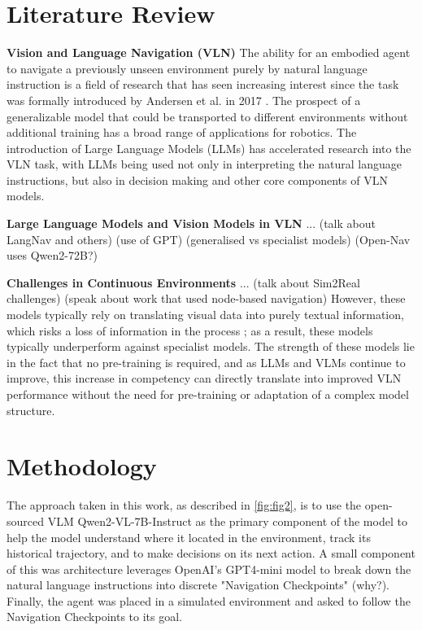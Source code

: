 \documentclass{svproc}
\begin{document}
\section{Literature Review}
    \textbf{Vision and Language Navigation (VLN)}  The ability for an embodied agent to navigate a previously unseen environment purely by natural language instruction is a field of research that has seen increasing interest since the task was formally introduced by Andersen et al. in 2017 \cite{8578485}. The prospect of a generalizable model that could be transported to different environments without additional training has a broad range of applications for robotics.
    \newline
    The introduction of Large Language Models (LLMs) has accelerated research into the VLN task, with LLMs being used not only in interpreting the natural language instructions, but also in decision making and other core components of VLN models.
    \newline \par
    \textbf{Large Language Models and Vision Models in VLN}  ... (talk about LangNav and others) (use of GPT) (generalised vs specialist models) (Open-Nav uses Qwen2-72B?)
    \newline \par
    \textbf{Challenges in Continuous Environments} ... (talk about Sim2Real challenges) (speak about work that used node-based navigation)
    \newline
    However, these models typically rely on translating visual data into purely textual information, which risks a loss of information in the process \cite{pan2024langnavlanguageperceptualrepresentation}; as a result, these models typically underperform against specialist models. The strength of these models lie in the fact that no pre-training is required, and as LLMs and VLMs continue to improve, this increase in competency can directly translate into improved VLN performance without the need for pre-training or adaptation of a complex model structure.
    \newline
    \newline


\section{Methodology}
    The approach taken in this work, as described in \ref{fig:fig2}, is to use the open-sourced VLM Qwen2-VL-7B-Instruct \cite{qwen2} as the primary component of the model to help the model understand where it located in the environment, track its historical trajectory, and to make decisions on its next action. A small component of this was architecture leverages OpenAI's GPT4-mini model to break down the natural language instructions into discrete "Navigation Checkpoints" (why?). Finally, the agent was placed in a simulated environment and asked to follow the Navigation Checkpoints to its goal.
    
\end{document}
